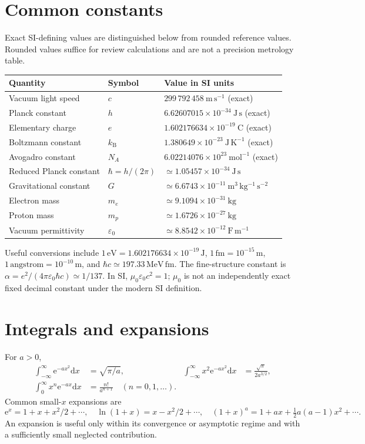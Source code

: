\documentclass[11pt,oneside]{book}
\newcommand{\dd}{\mathrm{d}}
\newcommand{\ee}{\mathrm{e}}
\newcommand{\kb}{k_{\mathrm B}}
\newcommand{\eps}{\varepsilon_0}
\newcommand{\mun}{\mu_0}
\theoremstyle{reviewstyle}
\begin{document}
\section{Common constants}
Exact SI-defining values are distinguished below from rounded reference values. Rounded values suffice for review calculations and are not a precision metrology table.
\begin{center}
\begin{tabular}{lll}
\toprule
Quantity & Symbol & Value in SI units\\
\midrule
Vacuum light speed & $c$ & $299\,792\,458\ \mathrm{m\,s^{-1}}$ (exact)\\
Planck constant & $h$ & $6.62607015\times10^{-34}\ \mathrm{J\,s}$ (exact)\\
Elementary charge & $e$ & $1.602176634\times10^{-19}\ \mathrm C$ (exact)\\
Boltzmann constant & $\kb$ & $1.380649\times10^{-23}\ \mathrm{J\,K^{-1}}$ (exact)\\
Avogadro constant & $N_A$ & $6.02214076\times10^{23}\ \mathrm{mol^{-1}}$ (exact)\\
Reduced Planck constant & $\hbar=h/(2\pi)$ & $\simeq1.05457\times10^{-34}\ \mathrm{J\,s}$\\
Gravitational constant & $G$ & $\simeq6.6743\times10^{-11}\ \mathrm{m^3\,kg^{-1}\,s^{-2}}$\\
Electron mass & $m_e$ & $\simeq9.1094\times10^{-31}\ \mathrm{kg}$\\
Proton mass & $m_p$ & $\simeq1.6726\times10^{-27}\ \mathrm{kg}$\\
Vacuum permittivity & $\eps$ & $\simeq8.8542\times10^{-12}\ \mathrm{F\,m^{-1}}$\\
\bottomrule
\end{tabular}
\end{center}
Useful conversions include $1\,\mathrm{eV}=1.602176634\times10^{-19}\,\mathrm J$, $1\,\mathrm{fm}=10^{-15}\,\mathrm m$, $1\,\text{angstrom}=10^{-10}\,\mathrm m$, and $\hbar c\simeq197.33\,\mathrm{MeV\,fm}$. The fine-structure constant is $\alpha=e^2/(4\pi\eps\hbar c)\simeq1/137$. In SI, $\mun\eps c^2=1$; $\mun$ is not an independently exact fixed decimal constant under the modern SI definition.
\section{Integrals and expansions}
For $a>0$,
\begin{align}
\int_{-\infty}^{\infty}\ee^{-ax^2}\dd x&=\sqrt{\pi/a},&
\int_{-\infty}^{\infty}x^2\ee^{-ax^2}\dd x&=\frac{\sqrt\pi}{2a^{3/2}},\\
\int_0^\infty x^n\ee^{-ax}\dd x&=\frac{n!}{a^{n+1}}\quad(n=0,1,\ldots).&&
\end{align}
Common small-$x$ expansions are
\begin{equation}\ee^x=1+x+x^2/2+\cdots,\quad \ln(1+x)=x-x^2/2+\cdots,\quad (1+x)^a=1+ax+\tfrac12a(a-1)x^2+\cdots.\end{equation}
An expansion is useful only within its convergence or asymptotic regime and with a sufficiently small neglected contribution.
\end{document}

